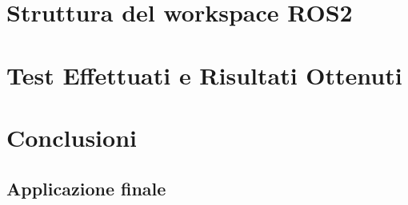 \documentclass[11pt]{report}
\begin{document}
\chapter{Struttura del workspace ROS2}

\chapter{Test Effettuati e Risultati Ottenuti}

\chapter{Conclusioni}
\label{cap:Conclusioni}
\section{Applicazione finale}



\end{document}
